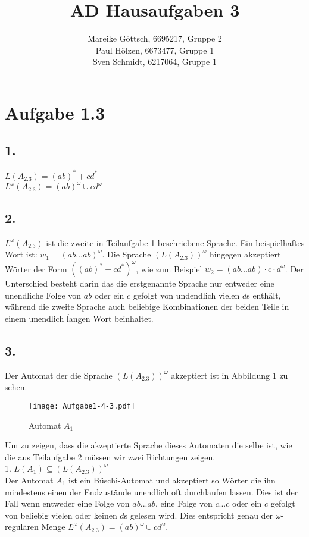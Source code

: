 \documentclass[12pt, paper=a4]{article}
\author{Mareike Göttsch, 6695217, Gruppe 2\\Paul Hölzen, 6673477, Gruppe 1\\Sven Schmidt, 6217064, Gruppe 1}
\title{AD Hausaufgaben 3}
\begin{document}
\maketitle

\section*{Aufgabe 1.3}
\subsection*{1.}
$L(A_{2.3}) = (ab)^* + cd^*$\\
$L^\omega(A_{2.3}) = (ab)^\omega \cup cd^\omega$\\

\subsection*{2.}
$L^\omega(A_{2.3})$ ist die zweite in Teilaufgabe 1 beschriebene Sprache. Ein beispielhaftes Wort ist: $w_1 = (ab...ab)^\omega$. Die Sprache $(L(A_{2.3}))^\omega$ hingegen akzeptiert Wörter der Form $((ab)^* + cd^*)^\omega$, wie zum Beispiel $w_2 = (ab...ab)\cdot c \cdot d^\omega$. Der Unterschied besteht darin das die erstgenannte Sprache nur entweder eine unendliche Folge von $ab$ oder ein $c$ gefolgt von undendlich vielen $d$s enthält, während die zweite Sprache auch beliebige Kombinationen der beiden Teile in einem unendlich ĺangen Wort beinhaltet.\\

\subsection*{3.}
Der Automat der die Sprache $(L(A_{2.3}))^\omega$ akzeptiert ist in Abbildung 1 zu sehen.\\

\begin{figure}[h!]
\centering
\texttt{[image: Aufgabe1-4-3.pdf]}
\caption{Automat $A_1$}
\end{figure}

\newpage
Um zu zeigen, dass die akzeptierte Sprache dieses Automaten die selbe ist, wie die aus Teilaufgabe 2 müssen wir zwei Richtungen zeigen.\\

1. $L(A_1) \subseteq (L(A_{2.3}))^\omega$\\
Der Automat $A_1$ ist ein Büschi-Automat und akzeptiert so Wörter die ihn mindestens einen der Endzustände unendlich oft durchlaufen lassen. Dies ist der Fall wenn entweder eine Folge von $ab...ab$, eine Folge von $c...c$ oder ein $c$ gefolgt von beliebig vielen oder keinen $d$s gelesen wird. Dies entspricht genau der $\omega$-regulären Menge $L^\omega(A_{2.3}) = (ab)^\omega \cup cd^\omega$.\\
\end{document}
